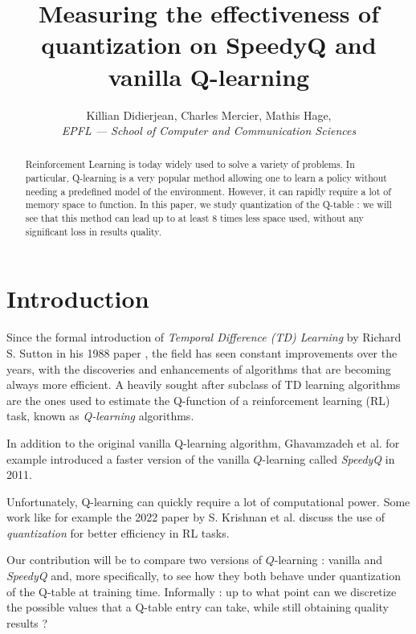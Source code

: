 \documentclass[10pt,conference,compsocconf]{IEEEtran}
\begin{document}
\title{Measuring the effectiveness of quantization on SpeedyQ and vanilla Q-learning}

\author{
  Killian Didierjean, Charles Mercier, Mathis Hage,\\
  \textit{EPFL --- School of Computer and Communication Sciences}
}

\maketitle

\begin{abstract}
 Reinforcement Learning is today widely used to solve a variety of problems. In particular, Q-learning is a very popular method allowing one to learn a policy without needing a predefined model of the environment. However, it can rapidly require a lot of memory space to function. In this paper, we study quantization of the Q-table : we will see that this method can lead up to at least 8 times less space used, without any significant loss in results quality.
\end{abstract}

\section{Introduction}

    Since the formal introduction of \textit{Temporal Difference (TD) Learning} by Richard S. Sutton in his 1988 paper \cite{suttonTDLearning}, the field has seen constant improvements over the years, with the discoveries and enhancements of algorithms that are becoming always more efficient. A heavily sought after subclass of TD learning algorithms are the ones used to estimate the Q-function of a reinforcement learning (RL) task, known as \textit{Q-learning} algorithms.

    In addition to the original vanilla Q-learning algorithm, Ghavamzadeh et al. for example introduced a faster version of the vanilla $Q$-learning called \textit{SpeedyQ} in 2011. 
    
    Unfortunately, Q-learning can quickly require a lot of computational power. Some work like for example the 2022 paper by S. Krishnan et al. \cite{krishnan2022quarlquantizationfastenvironmentally} discuss the use of \textit{quantization} for better efficiency in RL tasks.

    Our contribution will be to compare two versions of $Q$-learning : vanilla and \textit{SpeedyQ} and, more specifically, to see how they both behave under quantization of the Q-table at training time. Informally : up to what point can we discretize the possible values that a Q-table entry can take, while still obtaining quality results ?
\end{document}
